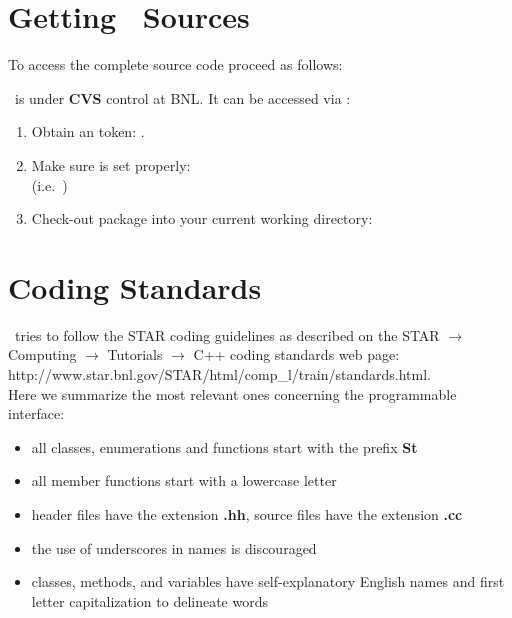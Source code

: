 
\section{Getting \StMcEvent\ Sources}  

To access the complete source code proceed as follows:

\StMcEvent\ is under {\bf CVS} control at BNL.  It can
be accessed via :   
\begin{enumerate}
  \item Obtain an  token: .
  \item Make sure  is set properly:\\ %
    (i.e.~)
  \item Check-out package into your current working directory:\\
\end{enumerate}


\section{Coding Standards}

\StMcEvent\ tries to follow the STAR coding guidelines as described on the
STAR $\rightarrow$ Computing $\rightarrow$ Tutorials $\rightarrow$ C++
coding standards web page: \\
http://www.star.bnl.gov/STAR/html/comp\_l/train/standards.html.\\
Here we
summarize the most relevant ones concerning the programmable interface:
\begin{itemize}
\item all classes, enumerations and functions start with the prefix
    \textbf{St}
\item all member functions start with a lowercase letter
\item header files have the extension \textbf{.hh}, source files have
    the extension\textbf{ .cc}
\item the use of underscores in names is discouraged
\item classes, methods, and variables have self-explanatory English
    names and first letter capitalization to delineate words
\end{itemize}

